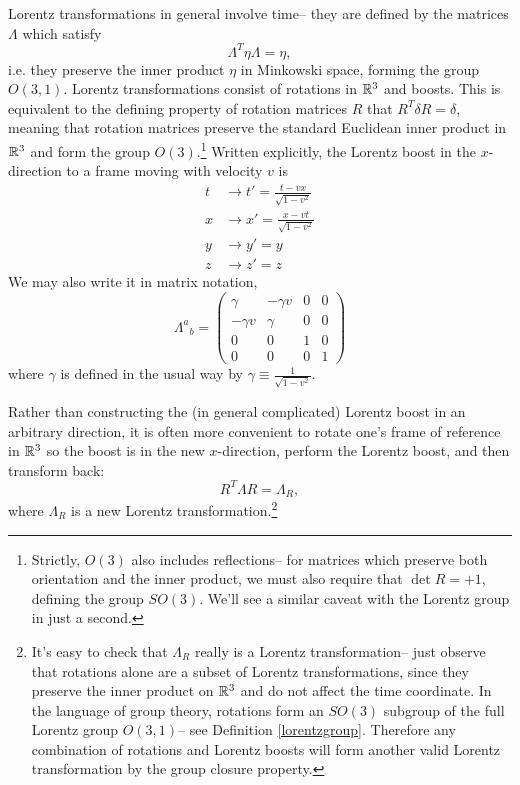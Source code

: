 Lorentz transformations in general involve time-- they are defined by the matrices $\Lambda$ which satisfy
$$\Lambda^T \eta \Lambda= \eta,$$
i.e. they preserve the inner product $\eta$ in Minkowski space, forming the group $O(3,1)$. Lorentz transformations consist of rotations in $\mathbb{R}^3$ and boosts. This is equivalent to the defining property of rotation matrices $R$ that $R^T \delta R=\delta$, meaning that rotation matrices preserve the standard Euclidean inner product in $\mathbb{R}^3$ and form the group $O(3)$.\footnote{Strictly, $O(3)$ also includes reflections-- for matrices which preserve both orientation and the inner product, we must also require that $\det R=+1$, defining the group $SO(3)$. We'll see a similar caveat with the Lorentz group in just a second.}
Written explicitly, the Lorentz boost in the $x$-direction to a frame moving with velocity $v$ is
\begin{align*}
t&\to t'=\frac{t-vx}{\sqrt{1-v^2}}\\
x&\to x'=\frac{x-vt}{\sqrt{1-v^2}}\\
y&\to y'=y\\
z&\to z'=z
\end{align*}
We may also write it in matrix notation,
$${\Lambda^a}_b =
\begin{pmatrix}
\gamma&-\gamma v &0 & 0\\
-\gamma v & \gamma & 0 & 0\\
0&0&1&0\\
0&0&0&1
\end{pmatrix}$$
where $\gamma$ is defined in the usual way by $\gamma \equiv \frac{1}{\sqrt{1-v^2}}$.

Rather than constructing the (in general complicated) Lorentz boost in an arbitrary direction, it is often more convenient to rotate one's frame of reference in $\mathbb{R}^3$ so the boost is in the new $x$-direction, perform the Lorentz boost, and then transform back:
$$R^T \Lambda R= \Lambda_R,$$
where $\Lambda_R$ is a new Lorentz transformation.\footnote{It's easy to check that $\Lambda_R$ really is a Lorentz transformation-- just observe that rotations alone are a subset of Lorentz transformations, since they preserve the inner product on $\mathbb{R}^3$ and do not affect the time coordinate. In the language of group theory, rotations form an $SO(3)$ subgroup of the full Lorentz group $O(3,1)$-- see Definition \ref{lorentzgroup}. Therefore any combination of rotations and Lorentz boosts will form another valid Lorentz transformation by the group closure property.}


